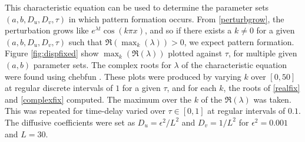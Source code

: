 This characteristic equation can be used to determine the parameter sets $(a,b,D_u,D_v,\tau)$ in which pattern formation occurs. From \eqref{perturbgrow}, the perturbation grows like $e^{\lambda t}\cos(k\pi x)$, and so if there exists a $k\neq0$ for a given $(a,b,D_u,D_v,\tau)$ such that $\Re(\max_k(\lambda))>0$, we expect pattern formation. Figure \ref{fig:dispfixed}  show $\max_k(\Re(\lambda))$ plotted against $\tau$, for multiple given $(a,b)$ parameter sets. The complex roots for $\lambda$ of the characteristic equation were found using chebfun \cite{chebfun}. These plots were produced by varying $k$ over $[0,50]$ at regular discrete intervals of $1$ for a given $\tau$, and for each $k$, the roots of \eqref{realfix} and \eqref{complexfix} computed. The maximum over the $k$ of the $\Re(\lambda)$ was taken. This was repeated for time-delay varied over $\tau\in[0,1]$ at regular intervals of $0.1$. The diffusive coefficients were set as $D_u=\epsilon^2/L^2$ and $D_v=1/L^2$ for $\epsilon^2=0.001$ and $L=30$.

